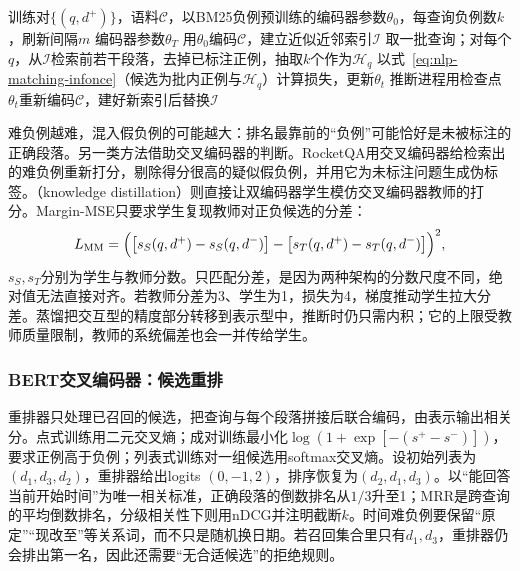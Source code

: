 \begin{algorithm}[ANCE式异步难负例训练]
  \label{alg:nlp-classification-ance}
  \begin{algorithmic}[1]
    \Require 训练对$\{(q,d^+)\}$，语料$\mathcal C$，以BM25负例预训练的编码器参数$\theta_0$，每查询负例数$k$，刷新间隔$m$
    \Ensure 编码器参数$\theta_T$
    \State 用$\theta_0$编码$\mathcal C$，建立近似近邻索引$\mathcal I$
      \State 取一批查询；对每个$q$，从$\mathcal I$检索前若干段落，去掉已标注正例，抽取$k$个作为$\mathcal H_q$
      \State 以式~\eqref{eq:nlp-matching-infonce}（候选为批内正例与$\mathcal H_q$）计算损失，更新$\theta_t$
        \State 推断进程用检查点$\theta_t$重新编码$\mathcal C$，建好新索引后替换$\mathcal I$
      \EndIf
    \EndFor
  \end{algorithmic}
\end{algorithm}

难负例越难，混入假负例的可能越大：排名最靠前的“负例”可能恰好是未被标注的正确段落。另一类方法借助交叉编码器的判断。RocketQA用交叉编码器给检索出的难负例重新打分，剔除得分很高的疑似假负例，并用它为未标注问题生成伪标签。（knowledge distillation）则直接让双编码器学生模仿交叉编码器教师的打分。Margin-MSE只要求学生复现教师对正负候选的分差：
\[
  L_{\mathrm{MM}}=\Bigl(\bigl[s_S(q,d^+)-s_S(q,d^-)\bigr]-\bigl[s_T(q,d^+)-s_T(q,d^-)\bigr]\Bigr)^2,
\]
$s_S,s_T$分别为学生与教师分数。只匹配分差，是因为两种架构的分数尺度不同，绝对值无法直接对齐。若教师分差为3、学生为1，损失为4，梯度推动学生拉大分差。蒸馏把交互型的精度部分转移到表示型中，推断时仍只需内积；它的上限受教师质量限制，教师的系统偏差也会一并传给学生。

\subsubsection{BERT交叉编码器：候选重排}
\label{sec:nlp-classification-rerank}

重排器只处理已召回的候选，把查询与每个段落拼接后联合编码，由\code{[CLS]}表示输出相关分。点式训练用二元交叉熵；成对训练最小化$\log(1+\exp[-(s^+-s^-)])$，要求正例高于负例；列表式训练对一组候选用softmax交叉熵。设初始列表为$(d_1,d_3,d_2)$，重排器给出logits $(0,-1,2)$，排序恢复为$(d_2,d_1,d_3)$。以“能回答当前开始时间”为唯一相关标准，正确段落的倒数排名从$1/3$升至1；MRR是跨查询的平均倒数排名，分级相关性下则用nDCG并注明截断$k$。时间难负例要保留“原定”“现改至”等关系词，而不只是随机换日期。若召回集合里只有$d_1,d_3$，重排器仍会排出第一名，因此还需要“无合适候选”的拒绝规则。

